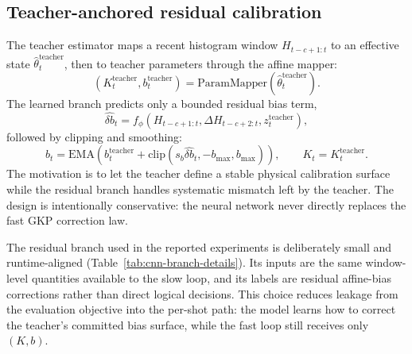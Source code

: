\documentclass[11pt]{article}
\begin{document}
\subsection{Teacher-anchored residual calibration}

The teacher estimator maps a recent histogram window \(H_{t-c+1:t}\) to an
effective state \(\hat{\theta}^{\mathrm{teacher}}_t\), then to teacher
parameters through the affine mapper:
\begin{equation}
    (K_t^{\mathrm{teacher}},b_t^{\mathrm{teacher}})
    = \mathrm{ParamMapper}(\hat{\theta}^{\mathrm{teacher}}_t).
\end{equation}
The learned branch predicts only a bounded residual bias term,
\begin{equation}
    \widehat{\delta b}_t =
    f_\phi(H_{t-c+1:t},\Delta H_{t-c+2:t},z_t^{\mathrm{teacher}}),
\end{equation}
followed by clipping and smoothing:
\begin{equation}
    b_t=\mathrm{EMA}\!\left(b_t^{\mathrm{teacher}}+
    \mathrm{clip}(s_b\widehat{\delta b}_t,-b_{\max},b_{\max})\right),
    \qquad K_t=K_t^{\mathrm{teacher}}.
\end{equation}
The motivation is to let the teacher define a stable physical calibration
surface while the residual branch handles systematic mismatch left by the
teacher.  The design is intentionally conservative: the neural network never
directly replaces the fast GKP correction law.

The residual branch used in the reported experiments is deliberately small
and runtime-aligned (Table~\ref{tab:cnn-branch-details}).  Its inputs are the
same window-level quantities available to the slow loop, and its labels are
residual affine-bias corrections rather than direct logical decisions.  This
choice reduces leakage from the evaluation objective into the per-shot path:
the model learns how to correct the teacher's committed bias surface, while
the fast loop still receives only \((K,b)\).
\end{document}
